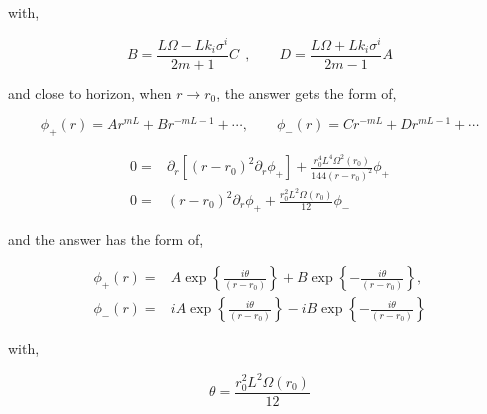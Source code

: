 with,

\begin{equation}
   B = \frac{L\Omega - Lk_i\sigma^i}{2m + 1}C ~~, \qquad D = \frac{L\Omega + Lk_i\sigma^i}{2m-1}A
\end{equation}

and close to horizon, when $r \rightarrow r_0$, the answer gets the form of,

\begin{equation}
   \phi_{+}(r) = Ar^{mL} + Br^{-mL-1} + \cdots, \qquad \phi_{-}(r) = Cr^{-mL} + Dr^{mL-1} + \cdots
\end{equation}

\begin{align}
    0 =& \partial_r\left[(r-r_0)^2\partial_r \phi_{+}\right] + \frac{r_0^4L^4\Omega^2(r_0)}{144(r-r_0)^2}\phi_{+}\nonumber\\
    0 =&  (r-r_0)^2 \partial_r \phi_{+} +  \frac{r_0^2L^2\Omega(r_0)}{12} \phi_{-}
\end{align}

and the answer has the form of,

\begin{align} \label{eq:NearHorizonSolutionBlackHoleAdS5Dirac}
   \phi_{+}(r) =& A\exp\left\{\frac{i\theta}{(r-r_0)}\right\} + B\exp\left\{-\frac{i\theta}{(r-r_0)}\right\}, \nonumber\\
   \phi_{-}(r) =& iA\exp\left\{\frac{i\theta}{(r-r_0)}\right\} - iB\exp\left\{-\frac{i\theta}{(r-r_0)}\right\}
\end{align}

with,

\begin{equation}
   \theta = \frac{r_0^2L^2\Omega(r_0)}{12}
\end{equation}
	
